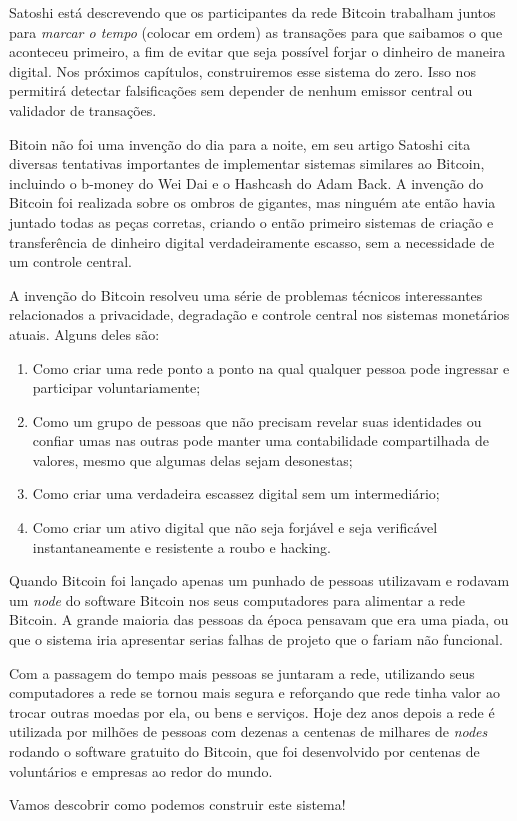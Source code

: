 Satoshi está descrevendo que os participantes da rede Bitcoin trabalham juntos para \textit{marcar o tempo} (colocar em ordem) as transações para que saibamos o que aconteceu primeiro, a fim de evitar que seja possível forjar o dinheiro de maneira digital. Nos próximos capítulos, construiremos esse sistema do zero. Isso nos permitirá detectar falsificações sem depender de nenhum emissor central ou validador de transações.

Bitoin não foi uma invenção do dia para a noite, em seu artigo Satoshi cita diversas tentativas importantes de implementar sistemas similares ao Bitcoin, incluindo o b-money do Wei Dai e o Hashcash do Adam Back. A invenção do Bitcoin foi realizada sobre os ombros de gigantes, mas ninguém ate então havia juntado todas as peças corretas, criando o então primeiro sistemas de criação e transferência de dinheiro digital verdadeiramente escasso, sem a necessidade de um controle central. 

A invenção do Bitcoin resolveu uma série de problemas técnicos interessantes relacionados a privacidade, degradação e controle central nos sistemas monetários atuais. Alguns deles são:

\begin{enumerate}
\item Como criar uma rede ponto a ponto na qual qualquer pessoa pode ingressar e participar voluntariamente;
\item Como um grupo de pessoas que não precisam revelar suas identidades ou confiar umas nas outras pode manter uma contabilidade compartilhada de valores, mesmo que algumas delas sejam desonestas;
\item Como criar uma verdadeira escassez digital sem um intermediário;
\item Como criar um ativo digital que não seja forjável e seja verificável instantaneamente e resistente a roubo e hacking.
\end{enumerate}

Quando Bitcoin foi lançado apenas um punhado de pessoas utilizavam e rodavam um \textit{node} do software Bitcoin nos seus computadores para alimentar a rede Bitcoin. A grande maioria das pessoas da época pensavam que era uma piada, ou que o sistema iria apresentar serias falhas de projeto que o fariam não funcional. 

Com a passagem do tempo mais pessoas se juntaram a rede, utilizando seus computadores a rede se tornou mais segura e reforçando que rede tinha valor ao trocar outras moedas por ela, ou bens e serviços. Hoje dez anos depois a rede é utilizada por milhões de pessoas com dezenas a centenas de milhares de \textit{nodes} rodando o software gratuito do Bitcoin, que foi desenvolvido por centenas de voluntários e empresas ao redor do mundo.

Vamos descobrir como podemos construir este sistema!